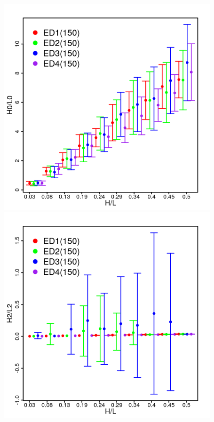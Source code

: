 \documentclass[12pt,A4,A4pt]{article}
\begin{document}
\begin{figure}[htbp]
\centering
\includegraphics[scale=.91]{imgs/plot_deall150_rdata_std_h0l0.png}
\quad
\includegraphics[scale=.91]{imgs/plot_deall150_rdata_std_h2l2.png}

\end{figure}
\end{document}
